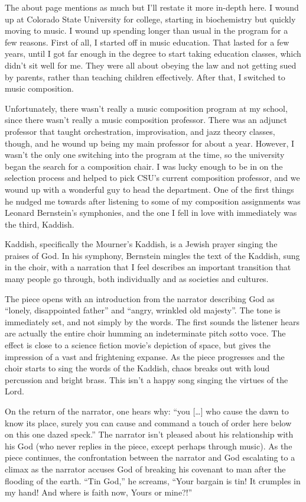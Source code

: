 
The about page mentions as much but I'll restate it more in-depth here.  I wound up at Colorado State University for college, starting in biochemistry but quickly moving to music.  I wound up spending longer than usual in the program for a few reasons.  First of all, I started off in music education.  That lasted for a few years, until I got far enough in the degree to start taking education classes, which didn't sit well for me.  They were all about obeying the law and not getting sued by parents, rather than teaching children effectively.  After that, I switched to music composition.

Unfortunately, there wasn't really a music composition program at my school, since there wasn't really a music composition professor.  There was an adjunct professor that taught orchestration, improvisation, and jazz theory classes, though, and he wound up being my main professor for about a year.  However, I wasn't the only one switching into the program at the time, so the university began the search for a composition chair.  I was lucky enough to be in on the selection process and helped to pick CSU's current composition professor, and we wound up with a wonderful guy to head the department.  One of the first things he nudged me towards after listening to some of my composition assignments was Leonard Bernstein's symphonies, and the one I fell in love with immediately was the third, Kaddish.

Kaddish, specifically the Mourner's Kaddish, is a Jewish prayer singing the praises of God.  In his symphony, Bernstein mingles the text of the Kaddish, sung in the choir, with a narration that I feel describes an important transition that many people go through, both individually and as societies and cultures.

The piece opens with an introduction from the narrator describing God as ``lonely, disappointed father'' and ``angry, wrinkled old majesty''.  The tone is immediately set, and not simply by the words.  The first sounds the listener hears are actually the entire choir humming an indeterminate pitch sotto voce. The effect is close to a science fiction movie's depiction of space, but gives the impression of a vast and frightening expanse.  As the piece progresses and the choir starts to sing the words of the Kaddish, chaos breaks out with loud percussion and bright brass.  This isn't a happy song singing the virtues of the Lord.

On the return of the narrator, one hears why: ``you [\ldots] who cause the dawn to know its place, surely you can cause and command a touch of order here below on this one dazed speck.''  The narrator isn't pleased about his relationship with his God (who never replies in the piece, except perhaps through music).  As the piece continues, the confrontation between the narrator and God escalating to a climax as the narrator accuses God of breaking his covenant to man after the flooding of the earth.  ``Tin God,'' he screams, ``Your bargain is tin!  It crumples in my hand!  And where is faith now, Yours or mine?!''


